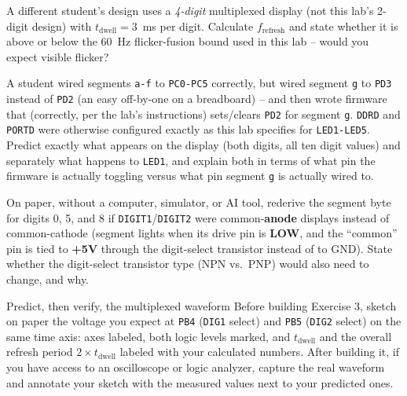 \documentclass[11pt]{article}
\begin{document}
\takehomebanner

\begin{trace}
A different student's design uses a \emph{4-digit} multiplexed display (not this
lab's 2-digit design) with $t_{\text{dwell}} = 3$~ms per digit. Calculate
$f_{\text{refresh}}$ and state whether it is above or below the 60~Hz flicker-fusion
bound used in this lab -- would you expect visible flicker?
\end{trace}

\begin{bug}
A student wired segments \texttt{a-f} to \texttt{PC0-PC5} correctly, but wired
segment \texttt{g} to \texttt{PD3} instead of \texttt{PD2} (an easy off-by-one on a
breadboard) -- and then wrote firmware that (correctly, per the lab's instructions)
sets/clears \texttt{PD2} for segment \texttt{g}. \texttt{DDRD} and \texttt{PORTD}
were otherwise configured exactly as this lab specifies for \texttt{LED1-LED5}.
Predict exactly what appears on the display (both digits, all ten digit values) and
separately what happens to \texttt{LED1}, and explain both in terms of what pin the
firmware is actually toggling versus what pin segment \texttt{g} is actually wired
to.
\end{bug}

\begin{writecode}
On paper, without a computer, simulator, or AI tool, rederive the segment byte for
digits 0, 5, and 8 if \texttt{DIGIT1}/\texttt{DIGIT2} were common-\textbf{anode}
displays instead of common-cathode (segment lights when its drive pin is
\textbf{LOW}, and the ``common'' pin is tied to \textbf{+5V} through the
digit-select transistor instead of to GND). State whether the digit-select
transistor type (NPN vs.\ PNP) would also need to change, and why.
\end{writecode}

\begin{drawex}{Predict, then verify, the multiplexed waveform}
Before building Exercise 3, sketch on paper the voltage you expect at \texttt{PB4}
(\texttt{DIG1} select) and \texttt{PB5} (\texttt{DIG2} select) on the same time axis:
axes labeled, both logic levels marked, and $t_{\text{dwell}}$ and the overall
refresh period $2\times t_{\text{dwell}}$ labeled with your calculated numbers. After
building it, if you have access to an oscilloscope or logic analyzer, capture the
real waveform and annotate your sketch with the measured values next to your
predicted ones.
\end{drawex}
\end{document}
